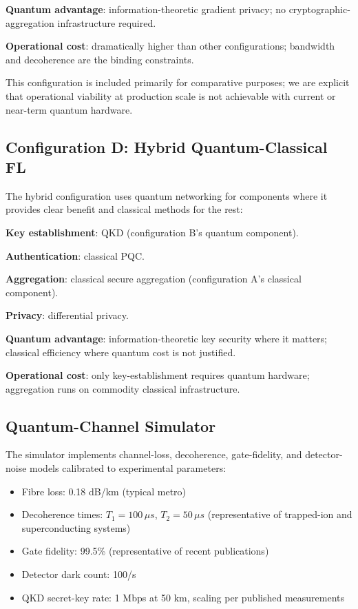 \documentclass[sigconf,nonacm]{acmart}
\begin{document}
\textbf{Quantum advantage}: information-theoretic gradient
privacy; no cryptographic-aggregation infrastructure required.

\textbf{Operational cost}: dramatically higher than other
configurations; bandwidth and decoherence are the binding
constraints.

This configuration is included primarily for comparative purposes;
we are explicit that operational viability at production scale is
not achievable with current or near-term quantum hardware.

\subsection{Configuration D: Hybrid Quantum-Classical FL}

The hybrid configuration uses quantum networking for components
where it provides clear benefit and classical methods for the
rest:

\textbf{Key establishment}: QKD (configuration B's quantum
component).

\textbf{Authentication}: classical PQC.

\textbf{Aggregation}: classical secure aggregation (configuration
A's classical component).

\textbf{Privacy}: differential privacy.

\textbf{Quantum advantage}: information-theoretic key security
where it matters; classical efficiency where quantum cost is not
justified.

\textbf{Operational cost}: only key-establishment requires quantum
hardware; aggregation runs on commodity classical infrastructure.

\subsection{Quantum-Channel Simulator}

The simulator implements channel-loss, decoherence,
gate-fidelity, and detector-noise models calibrated to
experimental parameters:

\begin{itemize}
  \item Fibre loss: 0.18 dB/km (typical metro)
  \item Decoherence times: $T_1 = 100\,\mu s$, $T_2 = 50\,\mu s$
        (representative of trapped-ion and
        superconducting systems)
  \item Gate fidelity: 99.5\% (representative of recent
        publications)
  \item Detector dark count: 100/s
  \item QKD secret-key rate: 1 Mbps at 50 km, scaling per
        published measurements
\end{itemize}
\end{document}
